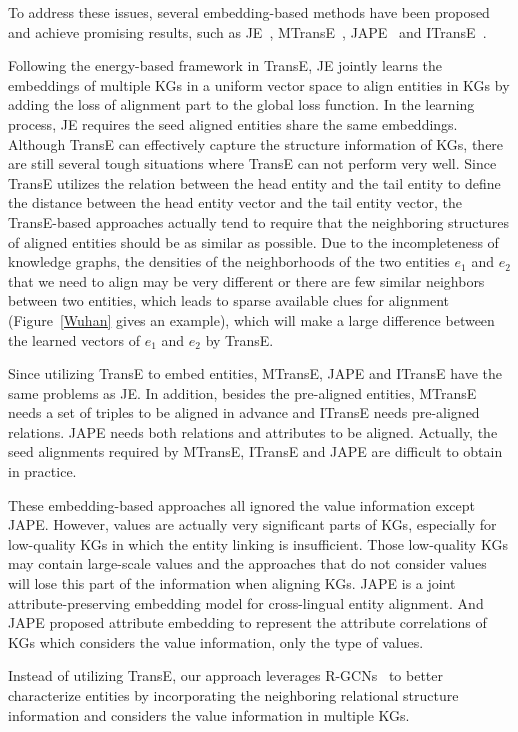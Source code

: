 	To address these issues, several embedding-based methods have been proposed and achieve promising results, such as JE~\cite{hao2016joint}, MTransE~\cite{chen2016multilingual}, JAPE~\cite{sun2017cross} and ITransE~\cite{zhu2017iterative}. 
	
	
	Following the energy-based framework in TransE, JE jointly learns the embeddings of multiple KGs in a uniform vector space to align entities in KGs by adding the loss of alignment part to the global loss function. In the learning process, JE requires the seed aligned entities share the same embeddings. Although TransE can effectively capture the structure information of KGs, there are still several tough situations where TransE can not perform very well. Since TransE utilizes the relation between the head entity and the tail entity to define the distance between the head entity vector and the tail entity vector, the TransE-based approaches actually tend to require that the neighboring structures of aligned entities should be as similar as possible. Due to the incompleteness of knowledge graphs, the densities of the neighborhoods of the two entities $e_1$ and $e_2$ that we need to align may be very different or there are few similar neighbors between two entities, which leads to sparse available clues for alignment (Figure~\ref{Wuhan} gives an example), which will make a large difference between the learned vectors of $e_1$ and $e_2$ by TransE. 
	
	Since utilizing TransE to embed entities, MTransE, JAPE and ITransE have the same problems as JE. In addition, besides the pre-aligned entities, MTransE needs a set of triples to be aligned in advance and ITransE needs pre-aligned relations. JAPE needs both relations and attributes to be aligned. Actually, the seed alignments required by MTransE, ITransE and JAPE are difficult to obtain in practice.
	
	These embedding-based approaches all ignored the value information except JAPE. However, values are actually very significant parts of KGs, especially for low-quality KGs in which the entity linking is insufficient. Those low-quality KGs may contain large-scale values and the approaches that do not consider values will lose this part of the information when aligning KGs. JAPE is a joint attribute-preserving embedding model for cross-lingual entity alignment. And JAPE proposed attribute embedding to represent the attribute correlations of KGs which considers the value information, only the type of values.
	
	Instead of utilizing TransE, our approach leverages R-GCNs~\cite{Schlichtkrull2017Modeling} to better characterize entities by incorporating the neighboring relational structure information and considers the value information in multiple KGs.
